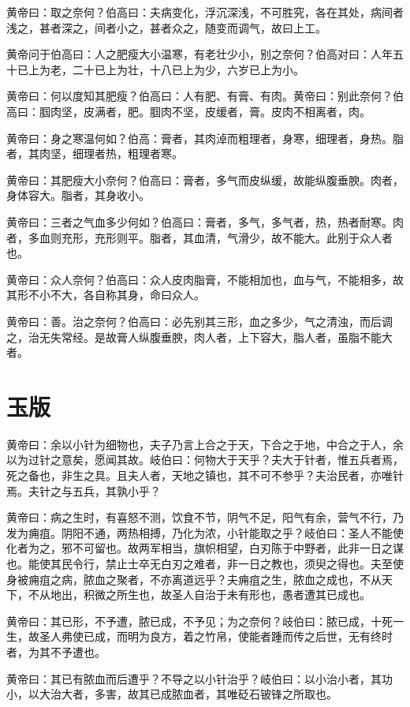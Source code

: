 \documentclass[a4paper,12pt,UTF8,twoside]{ctexbook}
\begin{document}
	黄帝曰：取之奈何？伯高曰：夫病变化，浮沉深浅，不可胜究，各在其处，病间者浅之，甚者深之，间者小之，甚者众之，随变而调气，故曰上工。
	
	黄帝问于伯高曰：人之肥瘦大小温寒，有老壮少小，别之奈何？伯高对曰：人年五十已上为老，二十已上为壮，十八已上为少，六岁已上为小。
	
	黄帝曰：何以度知其肥瘦？伯高曰：人有肥、有膏、有肉。黄帝曰：别此奈何？伯高曰：腘肉坚，皮满者，肥。腘肉不坚，皮缓者，膏。皮肉不相离者，肉。
	
	黄帝曰：身之寒温何如？伯高：膏者，其肉淖而粗理者，身寒，细理者，身热。脂者，其肉坚，细理者热，粗理者寒。
	
	黄帝曰：其肥瘦大小奈何？伯高曰：膏者，多气而皮纵缓，故能纵腹垂腴。肉者，身体容大。脂者，其身收小。
	
	黄帝曰：三者之气血多少何如？伯高曰：膏者，多气，多气者，热，热者耐寒。肉者，多血则充形，充形则平。脂者，其血清，气滑少，故不能大。此别于众人者也。
	
	黄帝曰：众人奈何？伯高曰：众人皮肉脂膏，不能相加也，血与气，不能相多，故其形不小不大，各自称其身，命曰众人。
	
	黄帝曰：善。治之奈何？伯高曰：必先别其三形，血之多少，气之清浊，而后调之，治无失常经。是故膏人纵腹垂腴，肉人者，上下容大，脂人者，虽脂不能大者。
	\chapter{玉版}
	
	黄帝曰：余以小针为细物也，夫子乃言上合之于天，下合之于地，中合之于人，余以为过针之意矣，愿闻其故。岐伯曰：何物大于天乎？夫大于针者，惟五兵者焉，死之备也，非生之具。且夫人者，天地之镇也，其不可不参乎？夫治民者，亦唯针焉。夫针之与五兵，其孰小乎？
	
	黄帝曰：病之生时，有喜怒不测，饮食不节，阴气不足，阳气有余，营气不行，乃发为痈疽。阴阳不通，两热相搏，乃化为浓，小针能取之乎？岐伯曰：圣人不能使化者为之，邪不可留也。故两军相当，旗帜相望，白刃陈于中野者，此非一日之谋也。能使其民令行，禁止士卒无白刃之难者，非一日之教也，须臾之得也。夫至使身被痈疽之病，脓血之聚者，不亦离道远乎？夫痈疽之生，脓血之成也，不从天下，不从地出，积微之所生也，故圣人自治于未有形也，愚者遭其已成也。
	
	黄帝曰：其已形，不予遭，脓已成，不予见；为之奈何？岐伯曰：脓已成，十死一生，故圣人弗使已成，而明为良方，着之竹帛，使能者踵而传之后世，无有终时者，为其不予遭也。
	
	黄帝曰：其已有脓血而后遭乎？不导之以小针治乎？岐伯曰：以小治小者，其功小，以大治大者，多害，故其已成脓血者，其唯砭石铍锋之所取也。
	
\end{document}
